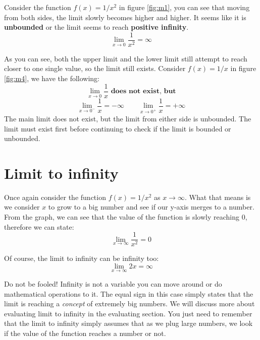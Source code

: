 Consider the function $f(x)=1/x^2$ in figure \ref{fig:m1},  you can see that moving from both sides, the limit slowly becomes higher and higher. It seems like it is \textbf{unbounded} or the limit seems to reach \textbf{positive infinity}.
\[ \lim_{x\to0} \frac{1}{x^2} = \infty \]

As you can see, both the upper limit and the lower limit still attempt to reach closer to one single value, so the limit still exists. Consider $f(x)=1/x$ in figure \ref{fig:m4}, we have the following:
\[
    \lim_{x\to0}\frac{1}{x} \textbf{ does not exist, but}
\]
\[
    \lim_{x\to0^-}\frac{1}{x} = -\infty
    \qquad
    \lim_{x\to0^+}\frac{1}{x} = +\infty
\]
The main limit does not exist, but the limit from either side is unbounded. The limit must exist first before continuing to check if the limit is bounded or unbounded.

\section{Limit to infinity}
Once again consider the function $f(x)=1/x^2$ as $x\to\infty$. What that means is we consider $x$ to grow to a big number and see if our y-axis merges to a number. From the graph, we can see that the value of the function is slowly reaching $0$, therefore we can state:
\[ \lim_{x\to\infty} \frac{1}{x^2} = 0\]

Of course, the limit to infinity can be infinity too:
\[ \lim_{x\to\infty} 2x = \infty \]

Do not be fooled! Infinity is not a variable you can move around or do mathematical operations to it. The equal sign in this case simply states that the limit is reaching a \textit{concept} of extremely big numbers. We will discuss more about evaluating limit to infinity in the evaluating section. You just need to remember that the limit to infinity simply assumes that as we plug large numbers, we look if the value of the function reaches a number or not.

